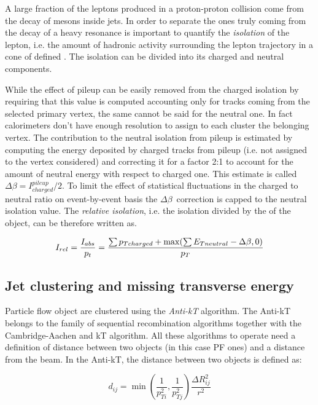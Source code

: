 A large fraction of the leptons produced in a proton-proton collision come from the decay of mesons inside jets. In order to separate the ones truly coming from the decay of a heavy resonance is important to quantify the \emph{isolation} of the lepton, i.e. the amount of hadronic activity surrounding the lepton trajectory in a cone of defined \DR. The isolation can be divided into its charged and neutral components. 

While the effect of pileup can be easily removed from the charged isolation by requiring that this value is computed accounting only for tracks coming from the selected primary vertex, the same cannot be said for the neutral one. In fact calorimeters don't have enough resolution to assign to each cluster the belonging vertex. The contribution to the neutral isolation from pileup is estimated by computing the energy deposited by charged tracks from pileup (i.e. not assigned to the vertex considered) and correcting it for a factor 2:1 to account for the amount of neutral energy with respect to charged one. This estimate is called \emph{$\Delta\beta = I^{pileup}_{charged}/2$}. To limit the effect of statistical fluctuations in the charged to neutral ratio on event-by-event basis the $\Delta\beta$\ correction is capped to the neutral isolation value. The \emph{relative isolation}, i.e. the isolation divided by the \pT of the object, can be therefore written as.

\begin{equation}
I_{rel} = \dfrac{I_{abs}}{p_{t}} =  \dfrac{\sum{p_{T charged}} + \operatorname{max}(\sum{E_{T neutral}} - \Delta \beta, 0)}{p_T}
\label{eq:db_rel_iso}
\end{equation}

\subsection{Jet clustering and missing transverse energy}

Particle flow object are clustered using the \emph{Anti-kT} \cite{Cacciari:2008gp} algorithm. The Anti-kT belongs to the family of sequential recombination algorithms together with the Cambridge-Aachen and kT algorithm. All these algorithms to operate need a definition of distance between two objects (in this case PF ones) and a distance from the beam. In the Anti-kT, the distance between two objects is defined as:

\begin{equation}
d_{ij} = \operatorname{min}(\dfrac{1}{p_{Ti}^2},\dfrac{1}{p_{Tj}^2})\dfrac{\Delta R_{ij}^2}{r^2}
\end{equation}

